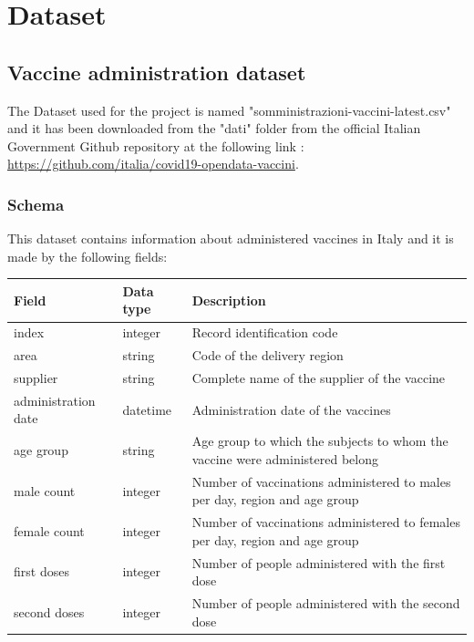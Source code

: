 \documentclass{article}
\begin{document}
\hfill\break
\newpage

\newpage
\section{Dataset}
\subsection{Vaccine administration dataset}
The Dataset used for the project is named {\selectfont"somministrazioni-vaccini-latest.csv"} and it has been downloaded from the {\selectfont"dati"} folder from the official Italian Government Github repository at the following link :\\ \url{https://github.com/italia/covid19-opendata-vaccini}.
\subsubsection{Schema}
\label{subsec:vaccination schema}
This dataset contains information about administered vaccines in Italy and it is made by the following fields:
\hfill\break
\begin{center}
\begin{tabular}{ |m{4cm}|m{2cm}|m{4.5cm}|}
  \hline
  \bfseries{Field} & \bfseries{Data type} & \bfseries{Description} \\
  \hline\hline
  index & integer & Record identification code\\
  \hline
  area & string & Code of the delivery region\\
    \hline
      supplier & string & Complete name of the supplier of the vaccine\\
    \hline
          administration date & datetime & Administration date of the vaccines\\
              \hline
          age group & string & Age group to which the subjects to whom the vaccine were administered belong\\
                        \hline
          male count & integer & Number of vaccinations administered to males per day, region and age group\\
                        \hline
          female count & integer & Number of vaccinations administered to females per day, region and age group\\
    \hline
  first doses & integer & Number of people administered with the first dose\\ 
    \hline
  second doses & integer & Number of people administered with the second dose\\
    \hline

\end{tabular}
\end{center}
\end{document}
